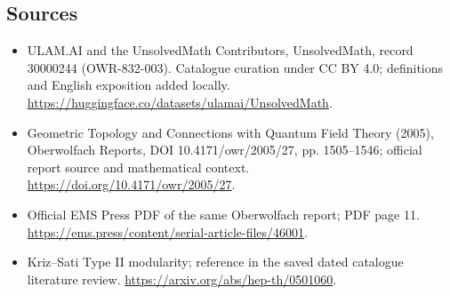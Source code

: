 \documentclass[11pt]{article}
\begin{document}
\subsection{Sources}
\begin{itemize}
\item[\hypertarget{source:30000244:1}{S1}] ULAM.AI and the UnsolvedMath Contributors, UnsolvedMath, record 30000244 (OWR-832-003). Catalogue curation under CC BY 4.0; definitions and English exposition added locally.
\url{https://huggingface.co/datasets/ulamai/UnsolvedMath}.
\item[\hypertarget{source:30000244:2}{S2}] Geometric Topology and Connections with Quantum Field Theory (2005), Oberwolfach Reports, DOI 10.4171/owr/2005/27, pp. 1505--1546; official report source and mathematical context.
\url{https://doi.org/10.4171/owr/2005/27}.
\item[\hypertarget{source:30000244:3}{S3}] Official EMS Press PDF of the same Oberwolfach report; PDF page 11.
\url{https://ems.press/content/serial-article-files/46001}.
\item[\hypertarget{source:30000244:4}{S4}] Kriz--Sati Type II modularity; reference in the saved dated catalogue literature review.
\url{https://arxiv.org/abs/hep-th/0501060}.
\end{itemize}
\label{end:30000244}
\end{document}

